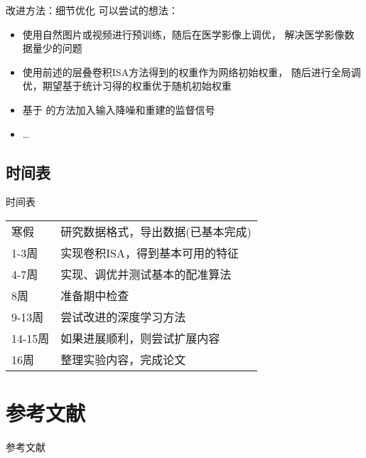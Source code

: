 \documentclass {beamer}
\begin{document}
\begin{frame}{改进方法：细节优化}
    可以尝试的想法：
    \begin{itemize}
        \item 使用自然图片或视频进行预训练，随后在医学影像上调优，
            解决医学影像数据量少的问题
        \item 使用前述的层叠卷积ISA方法得到的权重作为网络初始权重，
            随后进行全局调优，期望基于统计习得的权重优于随机初始权重
        \item 基于\cite{masci2011stacked}
            的方法加入输入降噪和重建的监督信号
        \item \dots
    \end{itemize}
\end{frame}

\subsection{时间表}
\begin{frame}{时间表}
    \begin{tabular}{ll}
        寒假 & 研究数据格式，导出数据(已基本完成) \\
        1-3周 & 实现卷积ISA，得到基本可用的特征 \\
        4-7周 & 实现、调优并测试基本的配准算法 \\
        8周 & 准备期中检查 \\
        9-13周 & 尝试改进的深度学习方法 \\
        14-15周 & 如果进展顺利，则尝试扩展内容 \\
        16周 & 整理实验内容，完成论文
    \end{tabular}
\end{frame}


\section{ }
\subsection{ }

\section[]{参考文献}
\begin{frame}[allowframebreaks]{参考文献}
    \printbibliography
\end{frame}
\end{document}
